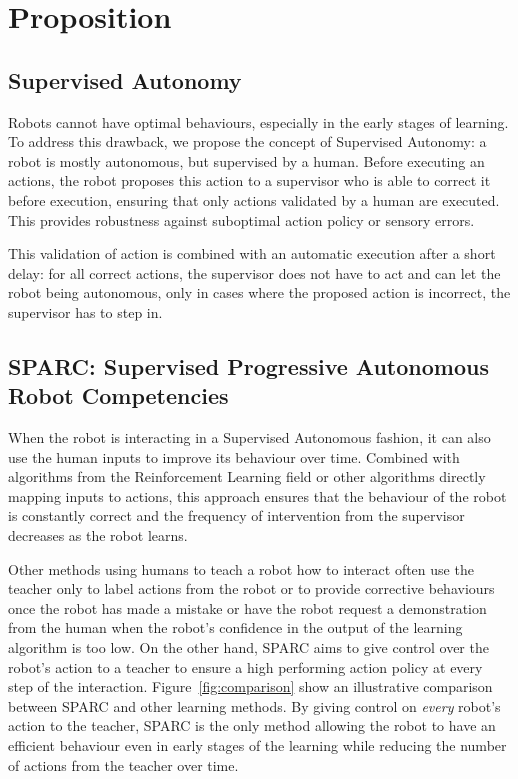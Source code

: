 \documentclass[conference]{IEEEtran}
\begin{document}
\section{Proposition}

\subsection{Supervised Autonomy}

Robots cannot have optimal behaviours, especially in the early stages of
learning. To address this drawback, we propose the concept of Supervised
Autonomy: a robot is mostly autonomous, but supervised by a human. Before
executing an actions, the robot proposes this action to a supervisor who is able
to correct it before execution, ensuring that only actions validated by a human
are executed. This provides robustness against suboptimal action policy or sensory
errors.

This validation of action is combined with an automatic execution after a short
delay: for all correct actions, the supervisor does not have to act and can let
the robot being autonomous, only in cases where the proposed action is
incorrect, the supervisor has to step in.

\subsection{SPARC: Supervised Progressive Autonomous Robot Competencies}

When the robot is interacting in a Supervised Autonomous fashion, it can also
use the human inputs to improve its behaviour over time. Combined with
algorithms from the Reinforcement Learning field or other algorithms directly
mapping inputs to actions, this approach ensures that the behaviour of the robot
is constantly correct and the frequency of intervention from the supervisor
decreases as the robot learns.

Other methods using humans to teach a robot how to interact often use the
teacher only to label actions from the robot or to provide corrective behaviours
once the robot has made a mistake or have the robot request a demonstration from
the human when the robot's confidence in the output of the learning algorithm is too
low.  On the other hand, SPARC aims to give control over the robot's action to a
teacher to ensure a high performing action policy at every step of the
interaction.  Figure~\ref{fig:comparison} show an illustrative comparison
between SPARC and other learning methods. By giving control on \emph{every}
robot's action to the teacher, SPARC is the only method allowing the robot to
have an efficient behaviour even in early stages of the learning while reducing
the number of actions from the teacher over time.
\end{document}
